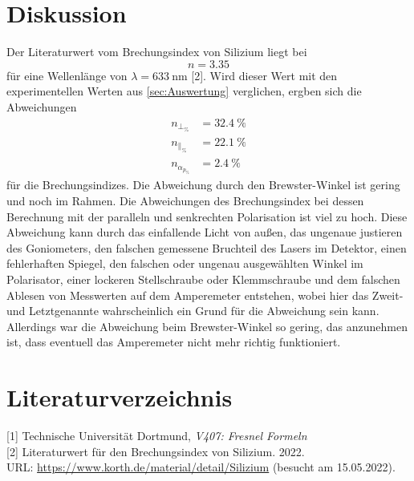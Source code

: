 \section{Diskussion}
\label{sec:Diskussion}
Der Literaturwert vom Brechungsindex von Silizium liegt bei 
\begin{equation*}
  n=3.35
\end{equation*}
für eine Wellenlänge von $\lambda=633\ \textrm{nm}$ [2]. Wird dieser Wert mit den experimentellen Werten aus \autoref{sec:Auswertung} verglichen, ergben sich die Abweichungen
\begin{align*}
  n_{\bot_\%}&=32.4\ \%\\
  n_{\|_\%}&=22.1\ \%\\
  n_{\alpha_{p_\%}}&=2.4\ \%
\end{align*}
für die Brechungsindizes. Die Abweichung durch den Brewster-Winkel ist gering und noch im Rahmen. Die Abweichungen des Brechungsindex bei dessen Berechnung mit der paralleln und senkrechten Polarisation ist viel zu hoch. Diese Abweichung kann durch das einfallende Licht von außen, das ungenaue justieren des Goniometers, den falschen gemessene Bruchteil des Lasers im Detektor, einen fehlerhaften Spiegel, den falschen oder ungenau ausgewählten Winkel im Polarisator, einer lockeren Stellschraube oder Klemmschraube und dem falschen Ablesen von Messwerten auf dem Amperemeter entstehen, wobei hier das Zweit- und Letztgenannte wahrscheinlich ein Grund für die Abweichung sein kann. Allerdings war die Abweichung beim Brewster-Winkel so gering, das anzunehmen ist, dass eventuell das Amperemeter nicht mehr richtig funktioniert. 

\section{Literaturverzeichnis} 
[1] Technische Universität Dortmund, \textit{V407: Fresnel Formeln}\\

[2] Literaturwert für den Brechungsindex von Silizium. 2022.\\ 
URL: \url{https://www.korth.de/material/detail/Silizium} (besucht am 15.05.2022).


